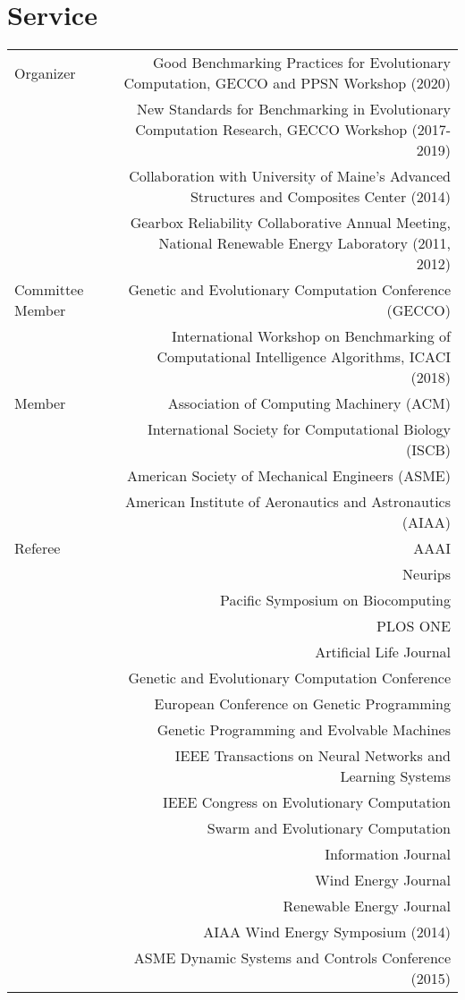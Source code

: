 \section*{Service}
\begin{tabular}{L!{\VRule}R}
    Organizer 
        & Good Benchmarking Practices for Evolutionary Computation, GECCO and PPSN Workshop (2020) \\
        & New Standards for Benchmarking in Evolutionary Computation Research, GECCO Workshop (2017-2019) \\
        & Collaboration with University of Maine's Advanced Structures and Composites Center (2014) \\
        & Gearbox Reliability Collaborative Annual Meeting, National Renewable Energy Laboratory (2011, 2012) \\
    Committee Member 
        & Genetic and Evolutionary Computation Conference (GECCO) \\
        & International Workshop on Benchmarking of Computational Intelligence Algorithms, ICACI (2018) \\
    Member 
        & Association of Computing Machinery (ACM) \\
        & International Society for Computational Biology (ISCB) \\
        & American Society of Mechanical Engineers (ASME) \\
        & American Institute of Aeronautics and Astronautics (AIAA) \\
    Referee 
        & AAAI \\
        & Neurips \\
        & Pacific Symposium on Biocomputing\\
        & PLOS ONE \\
        & Artificial Life Journal \\
        & Genetic and Evolutionary Computation Conference \\
        & European Conference on Genetic Programming \\
        & Genetic Programming and Evolvable Machines \\
        & IEEE Transactions on Neural Networks and Learning Systems\\
        & IEEE Congress on Evolutionary Computation \\
        & Swarm and Evolutionary Computation \\
        & Information Journal \\
        & Wind Energy Journal \\
        & Renewable Energy Journal \\
        & AIAA Wind Energy Symposium (2014) \\
        & ASME Dynamic Systems and Controls Conference (2015) \\
\end{tabular}

